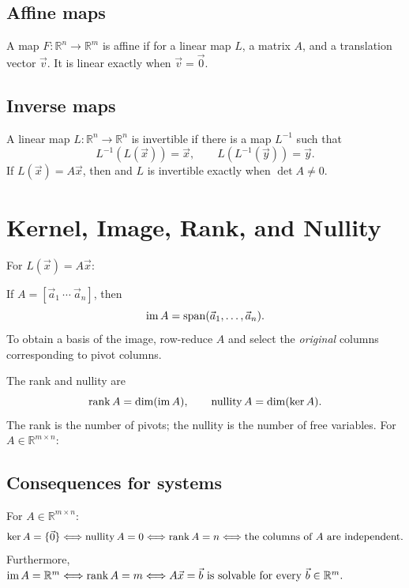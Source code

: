 \documentclass{article}
\begin{document}
\subsection{Affine maps}
A map $F:\mathbb{R}^n\to\mathbb{R}^m$ is affine if
for a linear map $L$, a matrix $A$, and a translation vector
$\vec{v}$. It is linear exactly when $\vec{v}=\vec{0}$.

\subsection{Inverse maps}
A linear map $L:\mathbb{R}^n\to\mathbb{R}^n$ is invertible if there is
a map $L^{-1}$ such that
\[
    L^{-1}(L(\vec{x}))=\vec{x},\qquad
    L(L^{-1}(\vec{y}))=\vec{y}.
\]
If $L(\vec{x})=A\vec{x}$, then
and $L$ is invertible exactly when $\det A\neq0$.

\section{Kernel, Image, Rank, and Nullity}

For $L(\vec{x})=A\vec{x}$:

If $A=[\vec{a}_1\ \cdots\ \vec{a}_n]$, then
\[
    \operatorname{im}A=\operatorname{span}(\vec{a}_1,\dots,\vec{a}_n).
\]
To obtain a basis of the image, row-reduce $A$ and select the
\emph{original} columns corresponding to pivot columns.

The rank and nullity are
\[
    \operatorname{rank} A=\dim(\operatorname{im}A),\qquad
    \operatorname{nullity}A=\dim(\ker A).
\]
The rank is the number of pivots; the nullity is the number of free
variables. For $A\in\mathbb{R}^{m\times n}$:

\subsection{Consequences for systems}
For $A\in\mathbb{R}^{m\times n}$:
\[\ker A=\{\vec{0}\}\Longleftrightarrow\operatorname{nullity}A=0\Longleftrightarrow\operatorname{rank} A=n\Longleftrightarrow\text{the columns of $A$ are independent.}\]
Furthermore, $\operatorname{im}A=\mathbb{R}^m \Longleftrightarrow\operatorname{rank} A=m \Longleftrightarrow A\vec{x}=\vec{b}\text{ is solvable for every }\vec{b}\in\mathbb{R}^m.$
\end{document}
